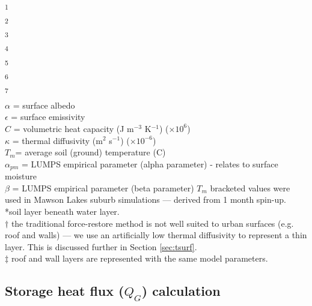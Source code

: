 \documentclass[gmd, manuscript]{copernicus}
\begin{document}
\begin{table}
\begin{center}
\begin{tabular}{  p{2.5cm} p{1.3cm} p{1.3cm} p{1.3cm} p{1.3cm} p{1.3cm} p{1.3cm} p{1.3cm} p{1.3cm} p{1.3cm}}
\hline
  \end{tabular}
  \end{center}
\footnotesize{\textsuperscript{1} \cite{Oke1987z}\\}
\footnotesize{\textsuperscript{2} \cite{stewart2014evaluation}\\}
\footnotesize{\textsuperscript{3} \cite{Jarvi2014a} \\}
\footnotesize{\textsuperscript{4} \cite{Narita1984} \\ }
\footnotesize{\textsuperscript{5} \cite{Asaeda1993}  \\}
\footnotesize{\textsuperscript{6} \cite{Grimmond1993}\\}
\footnotesize{\textsuperscript{7} \cite{Doll1985}\\}
\footnotesize{\ensuremath{\alpha} = surface albedo \\}
\footnotesize{\ensuremath{\epsilon} = surface emissivity \\}
\footnotesize{\ensuremath{C} = volumetric heat capacity (J m$^{-3}$ K$^{-1}$) ($\times10^{6}$) \\ }
\footnotesize{\ensuremath{\kappa} = thermal diffusivity (m$^{2}$ s$^{-1}$) ($\times10^{-6}$) \\}
\footnotesize{\ensuremath{T_{m}}= average soil (ground) temperature (\degree C)\\}
\footnotesize{\ensuremath{\alpha_{pm}} = LUMPS empirical parameter (alpha parameter) - relates to surface moisture \\}
\footnotesize{\ensuremath{\beta} = LUMPS empirical parameter (beta parameter)}
\footnotesize{\ensuremath{T_{m}} bracketed values were used in Mawson Lakes suburb simulations --- derived from 1 month spin-up.}\\
\footnotesize{*soil layer beneath water layer.} \\
\footnotesize{$\dagger$ the traditional force-restore method is not well suited to urban surfaces (e.g. roof and walls)  --- we use an artificially low thermal diffusivity to represent a thin layer. This is discussed further in Section \ref{sec:tsurf}.} \\
$\ddagger$ roof and wall layers are represented with the same model parameters. 
\end{table} 

\subsection{Storage heat flux ($Q_{G}$) calculation}\label{sec:lumps}
\end{document}
